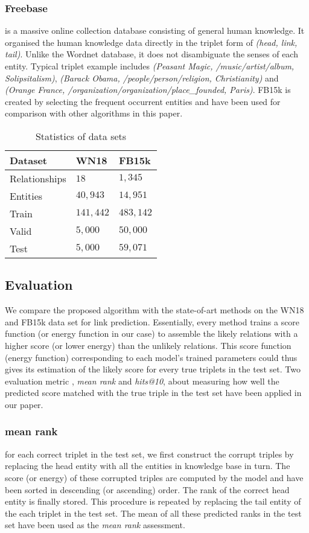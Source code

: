 \documentclass[10pt,journal]{IEEEtran}
\begin{document}
\subsubsection{Freebase} is a massive online collection database consisting of general human knowledge. It organised the human knowledge data  directly in the triplet form of \emph{(head, link, tail)}. Unlike the Wordnet database, it does not disambiguate the senses of each entity. Typical triplet example includes \emph{(Peasant Magic, /music/artist/album, Solipsitalism)}, \emph{(Barack Obama, /people/person/religion, Christianity)} and \emph{(Orange France, /organization/organization/place\_founded, Paris)}. FB15k \cite{bordes_learning_2011} is created by selecting the frequent occurrent entities and have been used for comparison with other algorithms in this paper.

\begin{table}[t]
\caption{Statistics of data sets} \label{data}
\centering
\begin{tabular}[center]{|l |l l |} 
 \hline
Dataset & WN18 & FB15k \\
 \hline 
Relationships & $18$ & $1,345$ \\
Entities & $40,943$ & $14,951$ \\
Train & $141,442$ & $483,142$ \\
Valid & $5,000$ & $50,000$ \\
Test & $5,000$ & $59,071$ \\
\hline
 \end{tabular}
 \end{table}
 
\subsection{Evaluation}
We compare the proposed algorithm with the state-of-art  methods on the WN18 and FB15k data set for link prediction. Essentially, every method trains a score function (or energy function in our case) to assemble the likely relations with a higher score (or lower energy) than the unlikely relations. This score function (energy function) corresponding to each model's trained parameters could thus gives its estimation of the likely score for every true triplets in the test set. Two evaluation metric \cite{bordes_learning_2011}, \emph{mean rank} and \emph{hits@10}, about measuring how well the predicted score matched with the true triple in the test set have been applied in our paper.

\subsubsection{mean rank} for each correct triplet in the test set, we first construct the corrupt triples by replacing the head entity with all the entities in knowledge base in turn. The score (or energy) of these corrupted triples are computed by the model and have been sorted in descending (or ascending) order. The rank of the correct head entity is finally stored. This procedure is repeated by replacing the tail entity of the each triplet in the test set. The mean of all these predicted ranks  in the test set have been used as the \emph{mean rank} assessment.
\end{document}
